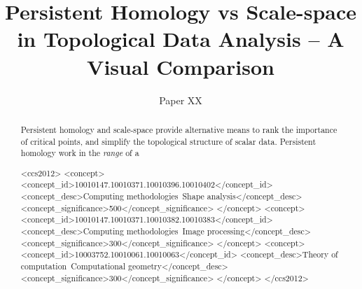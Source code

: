 \documentclass{egpubl}
\title[Short title]%
      {Persistent Homology vs Scale-space\\ in Topological Data Analysis -- A Visual Comparison}
\author{Paper XX}
\begin{document}

\maketitle
\begin{abstract}
Persistent homology and scale-space provide alternative means to rank the importance of critical points, and simplify the topological structure of scalar data. Persistent homology work in the \emph{range} of a 

\begin{CCSXML}
<ccs2012>
   <concept>
       <concept_id>10010147.10010371.10010396.10010402</concept_id>
       <concept_desc>Computing methodologies~Shape analysis</concept_desc>
       <concept_significance>500</concept_significance>
       </concept>
   <concept>
       <concept_id>10010147.10010371.10010382.10010383</concept_id>
       <concept_desc>Computing methodologies~Image processing</concept_desc>
       <concept_significance>300</concept_significance>
       </concept>
   <concept>
       <concept_id>10003752.10010061.10010063</concept_id>
       <concept_desc>Theory of computation~Computational geometry</concept_desc>
       <concept_significance>300</concept_significance>
       </concept>
 </ccs2012>
\end{CCSXML}

\printccsdesc
\end{abstract}
\end{document}
